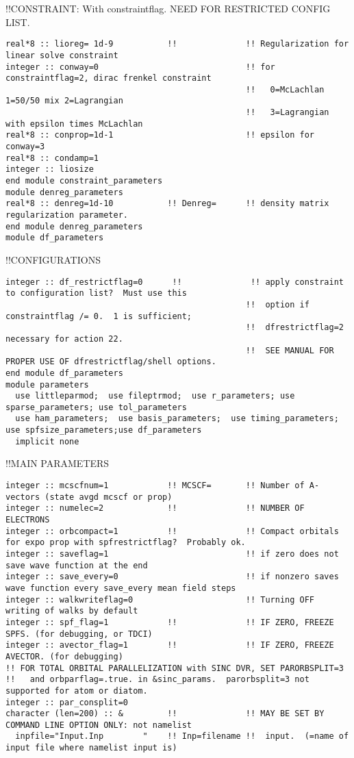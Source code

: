 !!{\large \quad CONSTRAINT: With constraintflag. NEED FOR RESTRICTED CONFIG LIST.}
\begin{verbatim}
real*8 :: lioreg= 1d-9           !!              !! Regularization for linear solve constraint
integer :: conway=0                              !! for constraintflag=2, dirac frenkel constraint
                                                 !!   0=McLachlan 1=50/50 mix 2=Lagrangian
                                                 !!   3=Lagrangian with epsilon times McLachlan
real*8 :: conprop=1d-1                           !! epsilon for conway=3
real*8 :: condamp=1
integer :: liosize
end module constraint_parameters
module denreg_parameters
real*8 :: denreg=1d-10           !! Denreg=      !! density matrix regularization parameter.
end module denreg_parameters
module df_parameters
\end{verbatim}
!!{\large \quad CONFIGURATIONS}
\begin{verbatim}
integer :: df_restrictflag=0      !!              !! apply constraint to configuration list?  Must use this
                                                 !!  option if constraintflag /= 0.  1 is sufficient;
                                                 !!  dfrestrictflag=2 necessary for action 22. 
                                                 !!  SEE MANUAL FOR PROPER USE OF dfrestrictflag/shell options.
end module df_parameters
module parameters
  use littleparmod;  use fileptrmod;  use r_parameters; use sparse_parameters; use tol_parameters
  use ham_parameters;  use basis_parameters;  use timing_parameters; use spfsize_parameters;use df_parameters
  implicit none
\end{verbatim}
!!{\large \quad MAIN PARAMETERS }
\begin{verbatim}
integer :: mcscfnum=1            !! MCSCF=       !! Number of A-vectors (state avgd mcscf or prop)
integer :: numelec=2             !!              !! NUMBER OF ELECTRONS
integer :: orbcompact=1          !!              !! Compact orbitals for expo prop with spfrestrictflag?  Probably ok.
integer :: saveflag=1                            !! if zero does not save wave function at the end
integer :: save_every=0                          !! if nonzero saves wave function every save_every mean field steps
integer :: walkwriteflag=0                       !! Turning OFF writing of walks by default
integer :: spf_flag=1            !!              !! IF ZERO, FREEZE SPFS. (for debugging, or TDCI)
integer :: avector_flag=1        !!              !! IF ZERO, FREEZE AVECTOR. (for debugging)
!! FOR TOTAL ORBITAL PARALLELIZATION with SINC DVR, SET PARORBSPLIT=3
!!   and orbparflag=.true. in &sinc_params.  parorbsplit=3 not supported for atom or diatom.
integer :: par_consplit=0
character (len=200) :: &         !!              !! MAY BE SET BY COMMAND LINE OPTION ONLY: not namelist
  inpfile="Input.Inp        "    !! Inp=filename !!  input.  (=name of input file where namelist input is)
\end{verbatim}
